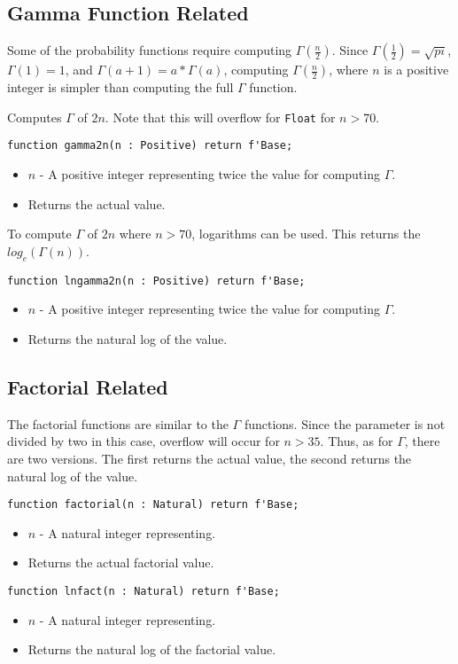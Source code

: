 \documentclass[10pt, openany]{book}
\newcommand{\datatype}[1]{\texttt{#1}}
\begin{document}
\subsection{Gamma Function Related}
Some of the probability functions require computing $\Gamma(\frac{n}{2})$.  Since $\Gamma(\frac{1}{2})=\sqrt{pi}$, $\Gamma(1) = 1$, and $\Gamma(a+1) = a*\Gamma(a)$, computing $\Gamma(\frac{n}{2})$, where $n$ is a positive integer is simpler than computing the full $\Gamma$ function.

Computes $\Gamma$ of $2n$.  Note that this will overflow for \datatype{Float} for $n>70$.
\begin{lstlisting}
function gamma2n(n : Positive) return f'Base;
\end{lstlisting}
\begin{itemize}
  \item $n$ - A positive integer representing twice the value for computing $\Gamma$.
  \item Returns the actual value.
\end{itemize}

To compute $\Gamma$ of $2n$ where $n>70$, logarithms can be used.  This returns the $log_e(\Gamma(n))$.
\begin{lstlisting}
function lngamma2n(n : Positive) return f'Base;
\end{lstlisting}
\begin{itemize}
  \item $n$ - A positive integer representing twice the value for computing $\Gamma$.
  \item Returns the natural log of the value.
\end{itemize}

\subsection{Factorial Related}
The factorial functions are similar to the $\Gamma$ functions.  Since the parameter is not divided by two in this case, overflow will occur for $n>35$.  Thus, as for $\Gamma$, there are two versions.  The first returns the actual value, the second returns the natural log of the value.
\begin{lstlisting}
function factorial(n : Natural) return f'Base;
\end{lstlisting}
\begin{itemize}
  \item $n$ - A natural integer representing.
  \item Returns the actual factorial value.
\end{itemize}
\begin{lstlisting}
function lnfact(n : Natural) return f'Base;
\end{lstlisting}
\begin{itemize}
  \item $n$ - A natural integer representing.
  \item Returns the natural log of the factorial value.
\end{itemize}
\end{document}

